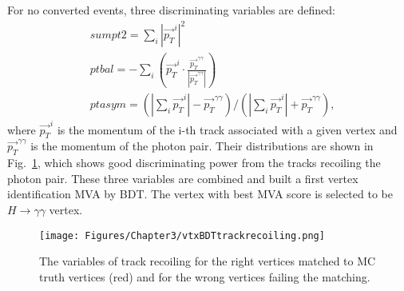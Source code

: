 For no converted events, three discriminating variables are defined:
\begin{equation} \label{eq:vtxDis1}
  \begin{aligned}
	& sumpt2 = \sum\limits_{i} |\vec{p_{T}}^{i}|^{2} \\
	& ptbal = - \sum\limits_{i}(\vec{p_{T}}^{i} \cdot \frac{\vec{p_{T}}^{\gamma\gamma}}{|\vec{p_{T}}^{\gamma\gamma}|}) \\
	& ptasym = (|\sum\limits_{i}\vec{p_{T}}^{i}|-\vec{p_{T}}^{\gamma\gamma})/(|\sum\limits_{i}\vec{p_{T}}^{i}|+\vec{p_{T}}^{\gamma\gamma}) ,
  \end{aligned}
\end{equation}
where $\vec{p_{T}}^{i}$ is the momentum of the i-th track associated with a given vertex and $\vec{p_{T}}^{\gamma\gamma}$ is the momentum of the photon pair.
Their distributions are shown in Fig.~\ref{fig:vtxBDTtrackrecoiling}, which shows good discriminating power from the tracks recoiling the photon pair.
These three variables are combined and built a first vertex identification MVA by BDT.
The vertex with best MVA score is selected to be $H \rightarrow \gamma\gamma$ vertex.
\begin{figure}[h]
  \centering
  \texttt{[image: Figures/Chapter3/vtxBDTtrackrecoiling.png]}
  \caption{The variables of track recoiling for the right vertices matched to MC truth vertices (red) and for the wrong vertices failing the matching.}
  \label{fig:vtxBDTtrackrecoiling}
\end{figure}










